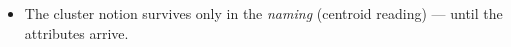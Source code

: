 \begin{itemize}
    \item The cluster notion survives only in the \emph{naming} (centroid reading) — until the attributes arrive. 

\end{itemize}

